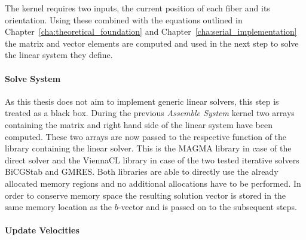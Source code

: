 The kernel requires two inputs, the current position of each fiber and its orientation. Using these combined with the equations outlined in Chapter~\ref{cha:theoretical_foundation} and Chapter~\ref{cha:serial_implementation} the matrix and vector elements are computed and used in the next step to solve the linear system they define.

\paragraph{Solve System}
As this thesis does not aim to implement generic linear solvers, this step is treated as a black box. During the previous \emph{Assemble System} kernel two arrays containing the matrix and right hand side of the linear system have been computed. These two arrays are now passed to the respective function of the library containing the linear solver. This is the MAGMA library in case of the direct solver and the ViennaCL library in case of the two tested iterative solvers BiCGStab and GMRES. Both libraries are able to directly use the already allocated memory regions and no additional allocations have to be performed. In order to conserve memory space the resulting solution vector is stored in the same memory location as the $b$-vector and is passed on to the subsequent steps.

\paragraph{Update Velocities}

